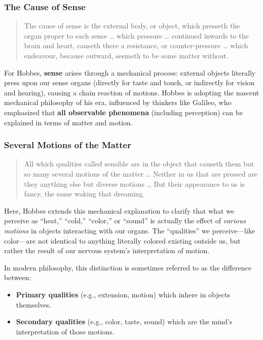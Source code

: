        \subsubsection{The Cause of Sense}

            \begin{quote}
            The cause of sense is the external body, or object, which presseth the organ proper to each sense … which pressure … continued inwards to the brain and heart, causeth there a resistance, or counter-pressure … which endeavour, because outward, seemeth to be some matter without.
            \end{quote}

            For Hobbes, \textbf{sense} arises through a mechanical process: external objects literally press upon our sense organs (directly for taste and touch, or indirectly for vision and hearing), causing a chain reaction of motions. Hobbes is adopting the nascent mechanical philosophy of his era, influenced by thinkers like Galileo, who emphasized that \textbf{all observable phenomena} (including perception) can be explained in terms of matter and motion.

        \subsubsection{Several Motions of the Matter}

            \begin{quote}
                All which qualities called sensible are in the object that causeth them but so many several motions of the matter … Neither in us that are pressed are they anything else but diverse motions … But their appearance to us is fancy, the same waking that dreaming.
            \end{quote}
            
            Here, Hobbes extends this mechanical explanation to clarify that what we perceive as “heat,” “cold,” “color,” or “sound” is actually the effect of \textit{various motions} in objects interacting with our organs. The “qualities” we perceive---like color---are not identical to anything literally colored existing outside us, but rather the result of our nervous system’s interpretation of motion.

In modern philosophy, this distinction is sometimes referred to as the difference between:
\begin{itemize}
  \item \textbf{Primary qualities} (e.g., extension, motion) which inhere in objects themselves.
  \item \textbf{Secondary qualities} (e.g., color, taste, sound) which are the mind’s interpretation of those motions.
\end{itemize}

